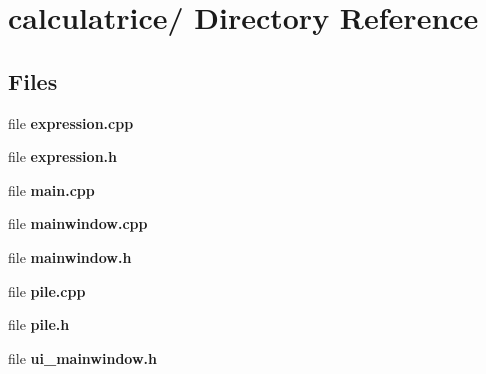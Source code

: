 \section{calculatrice/ Directory Reference}
\label{dir_46a91ace5fe8e5dc42a992754e4503d0}
\subsection*{Files}
\begin{DoxyCompactItemize}
\item 
file {\bf expression.\-cpp}
\item 
file {\bf expression.\-h}
\item 
file {\bf main.\-cpp}
\item 
file {\bf mainwindow.\-cpp}
\item 
file {\bf mainwindow.\-h}
\item 
file {\bf pile.\-cpp}
\item 
file {\bf pile.\-h}
\item 
file {\bf ui\-\_\-mainwindow.\-h}
\end{DoxyCompactItemize}
